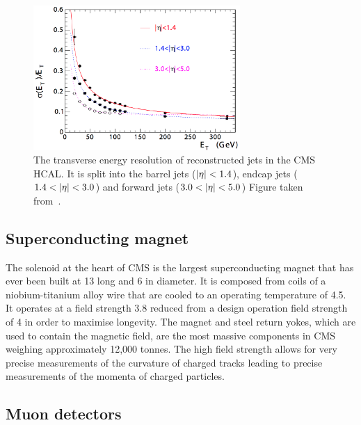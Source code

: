 \begin{figure}[htpb]
	\centering
	\includegraphics[width=0.7\textwidth]{Figures/CMSHCALRES}
	\caption[The transverse energy resolution of reconstructed jets in the CMS HCAL. It is split into the barrel jets ($\abseta<1.4$), endcap jets ($1.4<\abseta<3.0$) and forward jets ($3.0<\abseta<5.0$)]{The transverse energy resolution of reconstructed jets in the CMS HCAL. It is split into the barrel jets ($\abseta<1.4$), endcap jets ($1.4<\abseta<3.0$) and forward jets ($3.0<\abseta<5.0$) Figure taken from~\cite{CMSExperiment}.}
	\label{fig:CMSHCALRes}
\end{figure}

\subsection{Superconducting magnet}
\label{ssec:Magnet}

The solenoid at the heart of CMS is the largest superconducting magnet that has ever been built at 13\m{} long and 6\m{} in diameter.
It is composed from coils of a niobium-titanium alloy wire that are cooled to an operating temperature of 4.5\Kelvin{}. 
It operates at a field strength 3.8\Tesla{} reduced from a design operation field strength of 4\Tesla{} in order to maximise longevity.
The magnet and steel return yokes, which are used to contain the magnetic field, are the most massive components in CMS weighing approximately 12,000 tonnes.
The high field strength allows for very precise measurements of the curvature of charged tracks leading to precise measurements of the momenta of charged particles.

\subsection{Muon detectors}
\label{ssec:MuonChambers}

